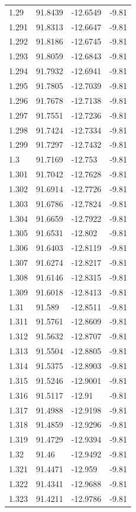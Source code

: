 \begin{tabular}{llll}
1.29 & 91.8439 & -12.6549 & -9.81 \\
1.291 & 91.8313 & -12.6647 & -9.81 \\
1.292 & 91.8186 & -12.6745 & -9.81 \\
1.293 & 91.8059 & -12.6843 & -9.81 \\
1.294 & 91.7932 & -12.6941 & -9.81 \\
1.295 & 91.7805 & -12.7039 & -9.81 \\
1.296 & 91.7678 & -12.7138 & -9.81 \\
1.297 & 91.7551 & -12.7236 & -9.81 \\
1.298 & 91.7424 & -12.7334 & -9.81 \\
1.299 & 91.7297 & -12.7432 & -9.81 \\
1.3 & 91.7169 & -12.753 & -9.81 \\
1.301 & 91.7042 & -12.7628 & -9.81 \\
1.302 & 91.6914 & -12.7726 & -9.81 \\
1.303 & 91.6786 & -12.7824 & -9.81 \\
1.304 & 91.6659 & -12.7922 & -9.81 \\
1.305 & 91.6531 & -12.802 & -9.81 \\
1.306 & 91.6403 & -12.8119 & -9.81 \\
1.307 & 91.6274 & -12.8217 & -9.81 \\
1.308 & 91.6146 & -12.8315 & -9.81 \\
1.309 & 91.6018 & -12.8413 & -9.81 \\
1.31 & 91.589 & -12.8511 & -9.81 \\
1.311 & 91.5761 & -12.8609 & -9.81 \\
1.312 & 91.5632 & -12.8707 & -9.81 \\
1.313 & 91.5504 & -12.8805 & -9.81 \\
1.314 & 91.5375 & -12.8903 & -9.81 \\
1.315 & 91.5246 & -12.9001 & -9.81 \\
1.316 & 91.5117 & -12.91 & -9.81 \\
1.317 & 91.4988 & -12.9198 & -9.81 \\
1.318 & 91.4859 & -12.9296 & -9.81 \\
1.319 & 91.4729 & -12.9394 & -9.81 \\
1.32 & 91.46 & -12.9492 & -9.81 \\
1.321 & 91.4471 & -12.959 & -9.81 \\
1.322 & 91.4341 & -12.9688 & -9.81 \\
1.323 & 91.4211 & -12.9786 & -9.81 \\

\end{tabular}

